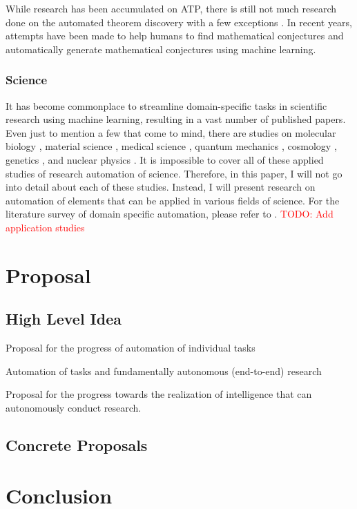 \documentclass{book}
\begin{document}
 While research has been accumulated on ATP, there is still not much research done on the automated theorem discovery with a few exceptions \cite{gao2014systematic}. In recent years, attempts have been made to help humans to find mathematical conjectures \cite{davies2021advancing} and
 automatically generate mathematical conjectures \cite{raayoni2021generating}  using machine learning.

\subsection{Science}


It has become commonplace to streamline domain-specific tasks in scientific research using machine learning, resulting in a vast number of published papers. Even just to mention a few that come to mind, there are studies on molecular biology \cite{jumper2021highly,senior2020improved}, material science \cite{ramprasad2017machine}, medical science \cite{vamathevan2019applications,shorten2021deep}, quantum mechanics \cite{carleo2017solving}, cosmology \cite{carleo2019machine}, genetics \cite{libbrecht2015machine}, and nuclear physics \cite{degrave2022magnetic}. It is impossible to cover all of these applied studies of research automation of science. Therefore, in this paper, I will not go into detail about each of these studies. Instead, I will present research on automation of elements that can be applied in various fields of science. For the literature survey of domain specific automation, please refer to \cite{xu2021artificial}. \textcolor{red}{TODO: Add application studies}



\chapter{Proposal}

\section{High Level Idea}

Proposal for the progress of automation of individual tasks

Automation of tasks and fundamentally autonomous (end-to-end) research

Proposal for the progress towards the realization of intelligence that can autonomously conduct research.

\section{Concrete Proposals}

\chapter{Conclusion}


% 


\end{document}
